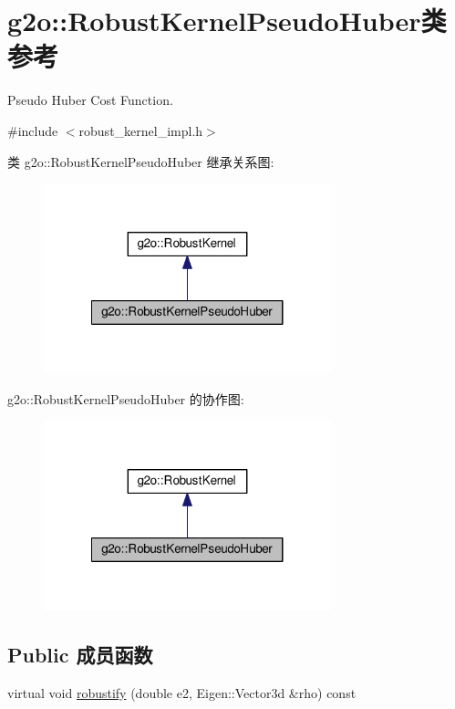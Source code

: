 \hypertarget{classg2o_1_1RobustKernelPseudoHuber}{\section{g2o\-:\-:Robust\-Kernel\-Pseudo\-Huber类 参考}
\label{classg2o_1_1RobustKernelPseudoHuber}
}


Pseudo Huber Cost Function.  




{\ttfamily \#include $<$robust\-\_\-kernel\-\_\-impl.\-h$>$}



类 g2o\-:\-:Robust\-Kernel\-Pseudo\-Huber 继承关系图\-:
\nopagebreak
\begin{figure}[H]
\begin{center}
\leavevmode
\includegraphics[width=236pt]{classg2o_1_1RobustKernelPseudoHuber__inherit__graph}
\end{center}
\end{figure}


g2o\-:\-:Robust\-Kernel\-Pseudo\-Huber 的协作图\-:
\nopagebreak
\begin{figure}[H]
\begin{center}
\leavevmode
\includegraphics[width=236pt]{classg2o_1_1RobustKernelPseudoHuber__coll__graph}
\end{center}
\end{figure}
\subsection*{Public 成员函数}
\begin{DoxyCompactItemize}
\item 
virtual void \hyperlink{classg2o_1_1RobustKernelPseudoHuber_a297dce8c836d499bd4c2818628574933}{robustify} (double e2, Eigen\-::\-Vector3d \&rho) const 
\end{DoxyCompactItemize}
